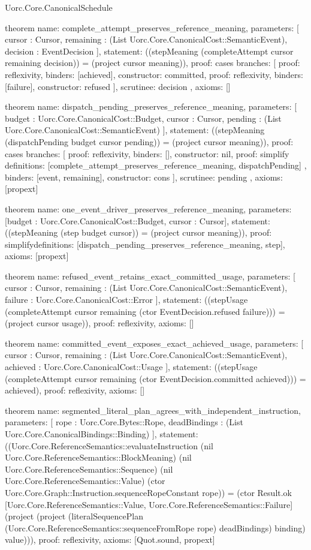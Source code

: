 \begin{lexlean}{Uorc.Core.CanonicalSchedule}
\begin{semanticmodule}
theorem{
  name: complete_attempt_preserves_reference_meaning,
  parameters: [
    cursor : Cursor,
    remaining : (List Uorc.Core.CanonicalCost::SemanticEvent),
    decision : EventDecision
  ],
  statement: ((stepMeaning (completeAttempt cursor remaining decision)) = (project cursor meaning)),
  proof: cases{
    branches: [
      {proof: reflexivity{}, binders: [achieved], constructor: committed},
      {proof: reflexivity{}, binders: [failure], constructor: refused}
    ],
    scrutinee: decision
  },
  axioms: []
}

theorem{
  name: dispatch_pending_preserves_reference_meaning,
  parameters: [
    budget : Uorc.Core.CanonicalCost::Budget,
    cursor : Cursor,
    pending : (List Uorc.Core.CanonicalCost::SemanticEvent)
  ],
  statement: ((stepMeaning (dispatchPending budget cursor pending)) = (project cursor meaning)),
  proof: cases{
    branches: [
      {proof: reflexivity{}, binders: [], constructor: nil},
      {
        proof: simplify{
          definitions: [complete_attempt_preserves_reference_meaning, dispatchPending]
        },
        binders: [event, remaining],
        constructor: cons
      }
    ],
    scrutinee: pending
  },
  axioms: [propext]
}

theorem{
  name: one_event_driver_preserves_reference_meaning,
  parameters: [budget : Uorc.Core.CanonicalCost::Budget, cursor : Cursor],
  statement: ((stepMeaning (step budget cursor)) = (project cursor meaning)),
  proof: simplify{definitions: [dispatch_pending_preserves_reference_meaning, step]},
  axioms: [propext]
}

theorem{
  name: refused_event_retains_exact_committed_usage,
  parameters: [
    cursor : Cursor,
    remaining : (List Uorc.Core.CanonicalCost::SemanticEvent),
    failure : Uorc.Core.CanonicalCost::Error
  ],
  statement: ((stepUsage (completeAttempt cursor remaining (ctor EventDecision.refused failure))) = (project cursor usage)),
  proof: reflexivity{},
  axioms: []
}

theorem{
  name: committed_event_exposes_exact_achieved_usage,
  parameters: [
    cursor : Cursor,
    remaining : (List Uorc.Core.CanonicalCost::SemanticEvent),
    achieved : Uorc.Core.CanonicalCost::Usage
  ],
  statement: ((stepUsage (completeAttempt cursor remaining (ctor EventDecision.committed achieved))) = achieved),
  proof: reflexivity{},
  axioms: []
}

theorem{
  name: segmented_literal_plan_agrees_with_independent_instruction,
  parameters: [
    rope : Uorc.Core.Bytes::Rope,
    deadBindings : (List Uorc.Core.CanonicalBindings::Binding)
  ],
  statement: ((Uorc.Core.ReferenceSemantics::evaluateInstruction (nil Uorc.Core.ReferenceSemantics::BlockMeaning) (nil Uorc.Core.ReferenceSemantics::Sequence) (nil Uorc.Core.ReferenceSemantics::Value) (ctor Uorc.Core.Graph::Instruction.sequenceRopeConstant rope)) = (ctor Result.ok [Uorc.Core.ReferenceSemantics::Value, Uorc.Core.ReferenceSemantics::Failure] (project (project (literalSequencePlan (Uorc.Core.ReferenceSemantics::sequenceFromRope rope) deadBindings) binding) value))),
  proof: reflexivity{},
  axioms: [Quot.sound, propext]
}
\end{semanticmodule}
\end{lexlean}
